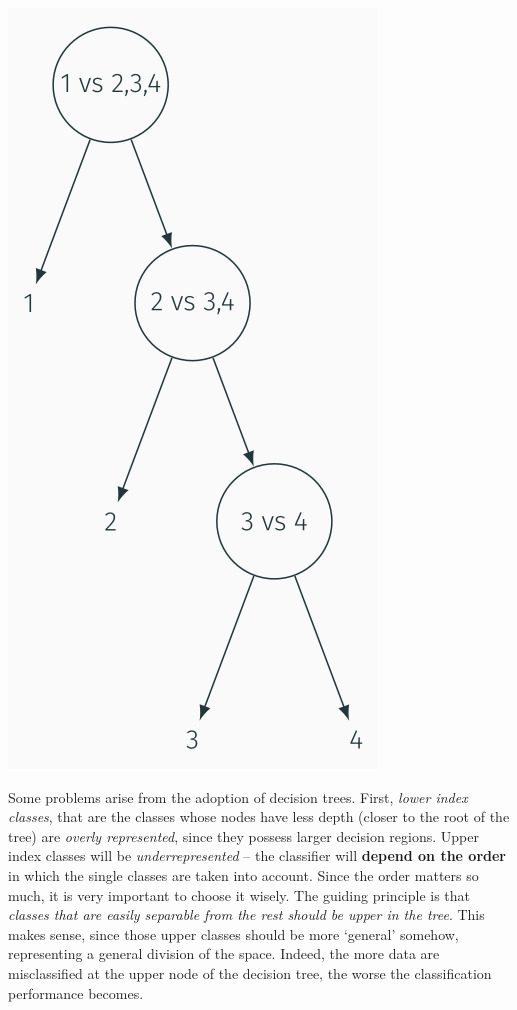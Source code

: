 \documentclass[10pt]{report}
\begin{document}
\begin{center}
\includegraphics[scale=0.25]{./pics/svm/svm-ovr-3.jpg}
\end{center}

Some problems arise from the adoption of decision trees. First, \emph{lower index
classes}, that are the classes whose nodes have less depth (closer to the root
of the tree) are \emph{overly represented}, since they possess larger decision
regions. Upper index classes will be \emph{underrepresented} -- the classifier will
\textbf{depend on the order} in which the single classes are taken into account. Since
the order matters so much, it is very important to choose it wisely. The guiding
principle is that \emph{classes that are easily separable from the rest should be
upper in the tree}. This makes sense, since those upper classes should be more
`general' somehow, representing a general division of the space. Indeed, the
more data are misclassified at the upper node of the decision tree, the worse
the classification performance becomes.
\end{document}
